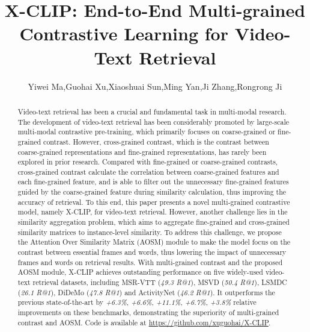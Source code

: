 \documentclass[sigconf]{acmart}
\begin{document}
\title{X-CLIP: End-to-End Multi-grained Contrastive Learning for Video-Text Retrieval}







  \author{
     Yiwei Ma,\quad Guohai Xu,\quad Xiaoshuai Sun,\quad Ming Yan,\quad Ji Zhang,\quad Rongrong Ji 
    }




\def\authors{Yiwei Ma, Guohai Xu, Xiaoshuai Sun, Ming Yan, Ji Zhang, Rongrong Ji}

\renewcommand{\shortauthors}{Yiwei Ma et al.}

\begin{abstract}
  Video-text retrieval has been a crucial and fundamental task in multi-modal research. The development of video-text retrieval has been considerably promoted by large-scale multi-modal contrastive pre-training, which primarily focuses on coarse-grained or fine-grained contrast. However, cross-grained contrast, which is the contrast between coarse-grained representations and fine-grained representations, has rarely been explored in prior research. Compared with fine-grained or coarse-grained contrasts, cross-grained contrast calculate the correlation between coarse-grained features and each fine-grained feature, and is able to filter out the unnecessary fine-grained features guided by the coarse-grained feature during similarity calculation, thus improving the accuracy of retrieval. To this end, this paper presents a novel multi-grained contrastive model, namely X-CLIP, for video-text retrieval. However, another challenge lies in the similarity aggregation problem, which aims to aggregate fine-grained and cross-grained similarity matrices to instance-level similarity. To address this challenge, we propose the Attention Over Similarity Matrix (AOSM) module to make the model focus on the contrast between essential frames and words, thus lowering the impact of unnecessary frames and words on retrieval results. With multi-grained contrast and the proposed AOSM module, X-CLIP achieves outstanding performance on five widely-used video-text retrieval datasets, including MSR-VTT (\emph{49.3 R@1}), MSVD (\emph{50.4 R@1}), LSMDC  (\emph{26.1 R@1}), DiDeMo  (\emph{47.8 R@1}) and ActivityNet (\emph{46.2 R@1}). It outperforms the previous state-of-the-art by \emph{+6.3\%}, \emph{+6.6\%}, \emph{+11.1\%}, \emph{+6.7\%}, \emph{+3.8\%} relative improvements on these benchmarks, demonstrating the superiority of multi-grained contrast and AOSM. Code is available at \url{https://github.com/xuguohai/X-CLIP}.
\end{abstract}
\end{document}
